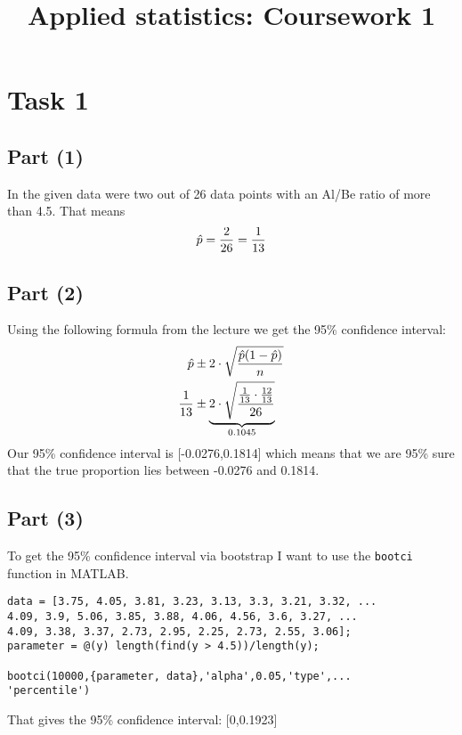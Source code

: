 \documentclass[british,a4paper,order=firstname]{mathscript}
\title{\textbf{Applied statistics: Coursework 1}}
\author{\person{Henry Haustein}}
\begin{document}
\pagestyle{plain}

\maketitle

\hypertarget{tocpage}{}
\tableofcontents
{}

\pagebreak
{}
\pagestyle{fancy}

\section{Task 1}
\subsection{Part (1)}
In the given data were two out of 26 data points with an Al/Be ratio of more than 4.5. That means
\begin{align}
	\hat{p} = \frac{2}{26} = \frac{1}{13}\notag
\end{align}

\subsection{Part (2)}
Using the following formula from the lecture we get the 95\% confidence interval:
\begin{align}
	\hat{p}&\pm 2\cdot\sqrt{\frac{\hat{p}(1-\hat{p})}{n}} \notag \\
	\frac{1}{13} &\pm \underbrace{2\cdot\sqrt{\frac{\frac{1}{13}\cdot\frac{12}{13}}{26}}}_{0.1045} \notag
\end{align}
Our 95\% confidence interval is [-0.0276,0.1814] which means that we are 95\% sure that the true proportion lies between -0.0276 and 0.1814. 

\subsection{Part (3)}
To get the 95\% confidence interval via bootstrap I want to use the \texttt{bootci} function in MATLAB. 
\begin{lstlisting}
data = [3.75, 4.05, 3.81, 3.23, 3.13, 3.3, 3.21, 3.32, ...
4.09, 3.9, 5.06, 3.85, 3.88, 4.06, 4.56, 3.6, 3.27, ...
4.09, 3.38, 3.37, 2.73, 2.95, 2.25, 2.73, 2.55, 3.06];
parameter = @(y) length(find(y > 4.5))/length(y);

bootci(10000,{parameter, data},'alpha',0.05,'type',...
'percentile')
\end{lstlisting}
That gives the 95\% confidence interval: [0,0.1923]
\end{document}
